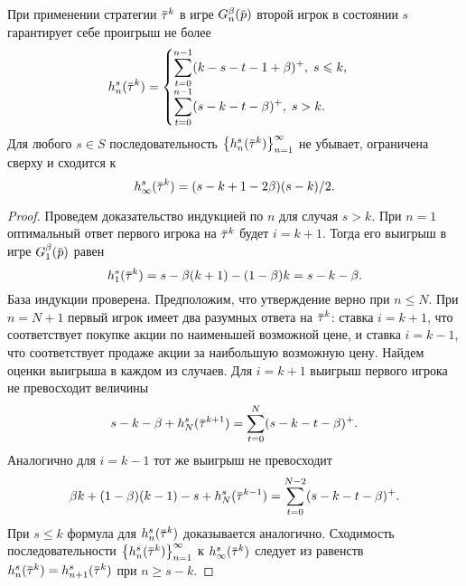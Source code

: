 {\begin{lemma}
  \label{ch3:upper-bound:lemma:vector-payoffs}
  При применении стратегии $\tauv^k$ в игре $\theG(\p)$ второй игрок в состоянии $s$ гарантирует себе проигрыш не более
  \begin{gather*}
    h^s_n(\tauv^k) = \begin{cases}
      \displaystyle \sum_{t=0}^{n-1} (k-s-t-1+\beta)^+, \; s \leqslant k, \\
      \displaystyle \sum_{t=0}^{n-1} (s-k-t-\beta)^+, \; s > k.
    \end{cases} 
  \end{gather*}
  Для любого $s \in S$ последовательность $\left\{ h^s_n(\tauv^k) \right\}_{n = 1}^\infty$ не убывает, ограничена сверху и сходится к %
  \begin{equation}
    \label{ch3:upper-bound:eq:max-payoff}
    h^s_\infty(\tauv^k) = (s - k + 1 - 2\beta)(s-k)/2.
  \end{equation}
\end{lemma}
\begin{proof}
  Проведем доказательство индукцией по $n$ для случая $s > k$.
  При $n = 1$ оптимальный ответ первого игрока на $\tauv^k$ будет $i = k + 1$.
  Тогда его выигрыш в игре $\theG[1](\p)$ равен
  \begin{equation*}
    h^s_1(\tauv^k) = s - \beta(k+1) - (1-\beta)k = s - k - \beta.
  \end{equation*}
  База индукции проверена.
  Предположим, что утверждение верно при $n \leqslant N$.
  При $n = N + 1$ первый игрок имеет два разумных ответа на $\tauv^k$: ставка $i=k+1$, что соответствует покупке акции по наименьшей возможной цене, и ставка $i=k-1$, что соответствует продаже акции за наибольшую возможную цену.
  Найдем оценки выигрыша в каждом из случаев.
  Для $i=k+1$ выигрыш первого игрока не превосходит величины
  \begin{equation*}
    s - k - \beta + h^s_N(\tauv^{k+1}) = \sum_{t=0}^N(s-k-t-\beta)^+.
  \end{equation*}
  Аналогично для $i = k - 1$ тот же выигрыш не превосходит
  \begin{equation*}
    \beta k + (1-\beta)(k-1) - s + h^s_N(\tauv^{k-1}) = \sum_{t=0}^{N-2}(s-k-t-\beta)^+.
  \end{equation*}
  При $s \leqslant k$ формула для $h^s_n(\tauv^k)$ доказывается аналогично.
  Сходимость последовательности $\left\{  h^s_n(\tauv^k) \right\}_{n=1}^\infty$ к $h^s_\infty(\tauv^k)$ следует из равенств
  $h^s_n(\tauv^k) = h^s_{n+1}(\tauv^k)$ при $n \geqslant s - k$.
\end{proof}

}
